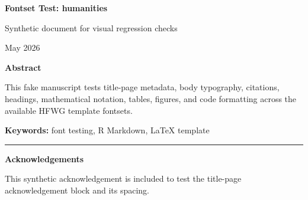 \documentclass[12pt]{article}
\newif\ifhfwganon
\begin{document}
\begin{titlepage}
\thispagestyle{empty}

\vspace*{0.14\textheight}
\begin{center}


{\LARGE\bfseries Fontset Test: humanities\par}

\vspace{0.25em}
{\large Synthetic document for visual regression checks\par}

\vspace{2em}

\begin{singlespace}
{\normalsize

\hfwgauthorblock

\par\vspace{2\baselineskip}
\hfwgseriesblock

\ifhfwganon\else
\vspace{0.5em}
{\small May 2026}\par
\fi

}
\end{singlespace}


\vspace{2em}

\begin{minipage}{0.8\textwidth}
\small\singlespacing
\textbf{Abstract}\par\vspace{0.25em}
This fake manuscript tests title-page metadata, body typography,
citations, headings, mathematical notation, tables, figures, and code
formatting across the available HFWG template fontsets.
\par\vspace{1em}
\noindent\textbf{Keywords: }font testing, R Markdown, LaTeX template
\end{minipage}

\vfill

\ifhfwganon\else
\begin{minipage}{0.8\textwidth}
\footnotesize\singlespacing
\noindent\rule{0.3\textwidth}{0.4pt}\par
\textbf{Acknowledgements}\par
This synthetic acknowledgement is included to test the title-page
acknowledgement block and its spacing.
\end{minipage}
\fi

\end{center}
\end{titlepage}
\fi\fi
\fi\fi
\end{document}
